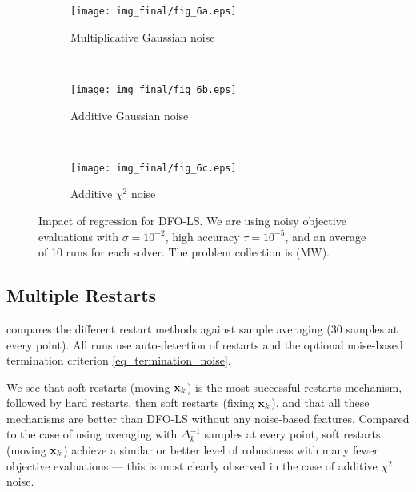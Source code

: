 \begin{figure}[t]
	\centering
	\begin{subfigure}[b]{0.48\textwidth}
		\texttt{[image: img\_final/fig\_6a.eps]}
		\caption{Multiplicative Gaussian noise}
		\label{fig_regression_noise2_ubgsn_noisyf}
	\end{subfigure}
	~
	\begin{subfigure}[b]{0.48\textwidth}
		\texttt{[image: img\_final/fig\_6b.eps]}
		\caption{Additive Gaussian noise}
		\label{fig_regression_noise2_addgsn_noisyf}
	\end{subfigure}
	\\
	\begin{subfigure}[b]{0.48\textwidth}
		\texttt{[image: img\_final/fig\_6c.eps]}
		\caption{Additive $\chi^2$ noise}
		\label{fig_regression_noise2_addchisq_noisyf}
	\end{subfigure}
	\caption{Impact of regression for DFO-LS. We are using noisy objective evaluations with $\sigma=10^{-2}$, high accuracy $\tau=10^{-5}$, and an average of 10 runs for each solver. The problem collection is (MW).}
	\label{fig_regression_noise2}
\end{figure}

\subsection{Multiple Restarts} \label{sec_restarts}
 compares the different restart methods against sample averaging (30 samples at every point).
All runs use auto-detection of restarts and
the optional noise-based termination criterion \eqref{eq_termination_noise}.

We see that soft restarts (moving $\mathbf{x}_k$) is the most successful restarts mechanism, followed by hard restarts, then soft restarts (fixing $\mathbf{x}_k$), and that all these mechanisms are better than DFO-LS without any noise-based features.
Compared to the case of using averaging with $\Delta_k^{-1}$ samples at every point, soft restarts (moving $\mathbf{x}_k$) achieve a similar or better level of robustness with many fewer objective evaluations --- this is most clearly observed in the case of additive $\chi^2$ noise.


